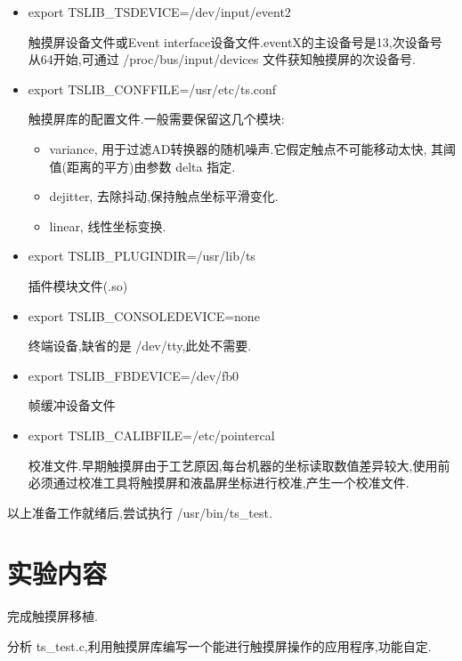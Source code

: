 \begin{itemize}
  \item export TSLIB\_TSDEVICE=/dev/input/event2

	触摸屏设备文件或Event interface设备文件.eventX的主设备号是13,次设备号
从64开始,可通过 /proc/bus/input/devices 文件获知触摸屏的次设备号.
  \item export TSLIB\_CONFFILE=/usr/etc/ts.conf         

	触摸屏库的配置文件.一般需要保留这几个模块:
  \begin{itemize}
    \item variance, 用于过滤AD转换器的随机噪声.它假定触点不可能移动太快,
	其阈值(距离的平方)由参数 delta 指定.
    \item dejitter, 去除抖动,保持触点坐标平滑变化.
    \item linear, 线性坐标变换.
  \end{itemize}
  \item export TSLIB\_PLUGINDIR=/usr/lib/ts

	插件模块文件(.so)
  \item export TSLIB\_CONSOLEDEVICE=none

	终端设备,缺省的是 /dev/tty,此处不需要.
  \item export TSLIB\_FBDEVICE=/dev/fb0

	帧缓冲设备文件
  \item export TSLIB\_CALIBFILE=/etc/pointercal

	校准文件.早期触摸屏由于工艺原因,每台机器的坐标读取数值差异较大,使用前
必须通过校准工具将触摸屏和液晶屏坐标进行校准,产生一个校准文件.
\end{itemize}

	以上准备工作就绪后,尝试执行 /usr/bin/ts\_test.

\section{实验内容}
	完成触摸屏移植.

	分析 ts\_test.c,利用触摸屏库编写一个能进行触摸屏操作的应用程序,功能自定.
